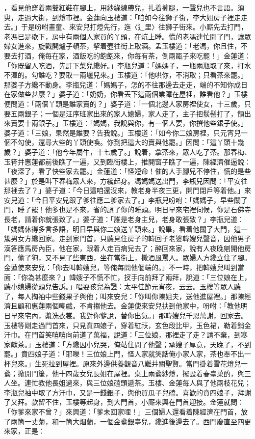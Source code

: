 ，看見他穿着兩雙紅鞋在腳上，用紗綠線帶兒，扎着褲腿，一聲兒也不言語。須臾，走過大街，到燈市裡。金蓮向玉樓道：「咱如今往獅子街，李大姐房子裡走走去。」于是吩咐畫童、來安兒打燈先行，迤〈辶里〉往獅子街來。小廝先去打門，老馮已是歇下，房中有兩個人家買的丫頭，在炕上睡。慌的老馮連忙開了門，讓眾婦女進來，旋戳開爐子頓茶，挈着壺往街上取酒。孟玉樓道：「老馮，你且住，不要去打酒，俺每在家，酒飯吃的飽飽來，你每有茶，倒兩甌子來吃罷！」金蓮道：「你既留人吃酒，先訂下菜兒纔好。」李瓶兒道：「媽媽子，一瓶兩瓶取了來，打水不渾的。勾誰吃？要取一兩壜兒來。」玉樓道：「他哄你，不消取；只看茶來罷。」那婆子方纔不動身。李瓶兒道：「媽媽子，怎的不往那邊去走走，端的不知你成日在家做些甚麼？」婆子道：「奶奶，你看丟下這兩個業障在屋裡，誰看他？」玉樓便問道：「兩個丫頭是誰家賣的？」婆子道：「一個北邊人家房裡使女，十三歲，只要五兩銀子；一個是汪序班家出來的家人媳婦，家人走了，主子把䯼髻打了，領出來賣要十兩銀子。」玉樓道：「媽媽，我說與你，有一個人要，你撰他些銀子使。」婆子道：「三娘，果然是誰要？告我說。」玉樓道：「如今你二娘房裡，只元宵兒一個不勾使，還尋大些的丫頭使喚。你到把這大的賣與他罷。」因問：「這丫頭十幾歲？」婆子道：「他今年屬牛，十七歲了。」說着，拿茶來，眾人吃了茶。那春梅、玉筲并惠蓮都前後瞧了一遍，又到臨街樓上，推開窗子瞧了一遍，陳經濟催逼說：「夜深了，看了快些家去罷。」金蓮道：「怪短命！催的人手腳兒不停住，慌的是些甚麼？」於是叫下春梅眾人來，方纔起身。馮媽媽送出門，李瓶兒因問：「平安往那裡去了？」婆子道：「今日這咱還沒來，教老身半夜三更，開門閉戶等着他。」來安兒道：「今日平安兒跟了爹往應二爹家去了。」李瓶兒吩咐：「媽媽子，早些關了門，睡了罷！他多也是不來，省的誤了你的睡頭。明日早來宅裡伺候，你是石佛寺長老，請着你就張致了。」婆子道：「誰是老身主兒，老身敢張致？」李瓶兒道：「媽媽休得多言多語，明日早與你二娘送丫頭來。」說畢，看着他關了大門，這一簇男女方纔回家。走到家門首，只聽見住房子的韓回子老婆韓嫂兒聲音，因他男子漢答應馬房內臣，他在家，跟着人走百病兒去了；醉回來家，說有人夜晚剜開他房門，偷了狗，又不見了些東西，坐在當街上，撒酒風罵人。眾婦人方纔立住了腳。金蓮使來安兒：「你去叫韓嫂兒，等俺每問他個端的。」不一時，把韓嫂兒叫到當面：「你為甚麼來？」韓嫂子不慌不忙，扠手向前拜了兩拜，說道：「三位娘在上，聽小媳婦從頭兒告訴。」唱耍孩兒為證：太平佳節元宵夜，云云。玉樓等眾人聽了，每人掏袖中些錢果子與他；叫來安兒：「你叫你陳姐夫，送他進屋裡。」那陳經濟且顧和惠蓮兩個嘲戲，不肯搊他去。金蓮使來安兒扶到他家中，吩咐：「教他明日早來宅內，漿洗衣裳。我對你爹說，替你出氣。」那韓嫂兒千恩萬謝，回家去。玉樓等剛走過門首來，只見賁四娘子，穿着紅祆，玄色段比甲，玉色裙，勒着銷金汗巾。在門首笑嘻嘻向前道了萬福，說道：「三位娘，那裡走了走？請不棄，到寒家獻茶。」玉樓道：「方纔因小兒哭，俺站住問了他聲；承嫂子厚意，天晚了，不到罷。」賁四娘子道：「耶嚛！三位娘上門，怪人家就笑話俺小家人家，茶也奉不出一杯兒來。」生死拉到屋裡。原來外邊供養觀音八難并關聖賢。當門掛着雪花燈兒一盞；掀開門簾，他十四歲女兒長姐在屋裡。桌上兩盞紗燈，擺設着春臺菓酌，與三人坐。連忙教他長姐過來，與三位娘磕頭遞茶。玉樓、金蓮每人與了他兩枝花兒；李瓶兒袖中取了方汗巾，又是一錢銀子，與他買瓜子兒磕。喜歡的賁四娘子，拜謝了又拜。款留不住，玉樓等起身，到大門首，小廝來興在門首迎接。金蓮就問：「你爹來家不曾？」來興道：「爹未回家哩！」三個婦人還看着陳經濟在門首，放了兩筒一丈菊，和一筒大烟蘭，一個金盞銀臺兒，纔進後邊去了。西門慶直至四更來家，正是：

